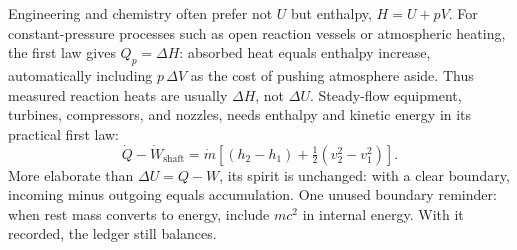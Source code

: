 \begin{challenge}
Engineering and chemistry often prefer not \(U\) but enthalpy, \(H=U+pV\). For constant-pressure processes such as open reaction vessels or atmospheric heating, the first law gives \(Q_p=\Delta H\): absorbed heat equals enthalpy increase, automatically including \(p\,\Delta V\) as the cost of pushing atmosphere aside. Thus measured reaction heats are usually \(\Delta H\), not \(\Delta U\). Steady-flow equipment, turbines, compressors, and nozzles, needs enthalpy and kinetic energy in its practical first law:
\[
  \dot Q-\dot W_{\text{shaft}}=\dot m\left[\left(h_2-h_1\right)+\tfrac12\left(v_2^2-v_1^2\right)\right].
\]
More elaborate than \(\Delta U=Q-W\), its spirit is unchanged: with a clear boundary, incoming minus outgoing equals accumulation. One unused boundary reminder: when rest mass converts to energy, include \(mc^2\) in internal energy. With it recorded, the ledger still balances.
\end{challenge}


